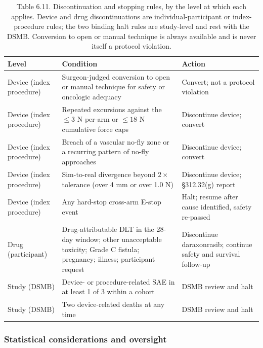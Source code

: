 \begin{table}[t]
\caption{Table 6.11. Discontinuation and stopping rules, by the level at which each
applies. Device and drug discontinuations are individual-participant or
index-procedure rules; the two binding halt rules are study-level and rest with the
DSMB. Conversion to open or manual technique is always available and is never itself
a protocol violation.}
\label{tab:sec06-stopping}
\centering
\begin{tabularx}{\textwidth}{L{3.3cm} Y L{4.6cm}}
\toprule
\textbf{Level} & \textbf{Condition} & \textbf{Action} \\
\midrule
Device (index procedure) & Surgeon-judged conversion to open or manual technique for safety or oncologic adequacy & Convert; not a protocol violation \\
Device (index procedure) & Repeated excursions against the $\leq 3$ N per-arm or $\leq 18$ N cumulative force caps & Discontinue device; convert \\
Device (index procedure) & Breach of a vascular no-fly zone or a recurring pattern of no-fly approaches & Discontinue device; convert \\
Device (index procedure) & Sim-to-real divergence beyond $2\times$ tolerance (over 4 mm or over 1.0 N) & Discontinue device; \S 312.32(g) report \\
Device (index procedure) & Any hard-stop cross-arm E-stop event & Halt; resume after cause identified, safety re-passed \\
Drug (participant) & Drug-attributable DLT in the 28-day window; other unacceptable toxicity; Grade C fistula; pregnancy; illness; participant request & Discontinue daraxonrasib; continue safety and survival follow-up \\
Study (DSMB) & Device- or procedure-related SAE in at least 1 of 3 within a cohort & DSMB review and halt \\
Study (DSMB) & Two device-related deaths at any time & DSMB review and halt \\
\bottomrule
\end{tabularx}
\end{table}

\subsubsection*{Statistical considerations and oversight}

